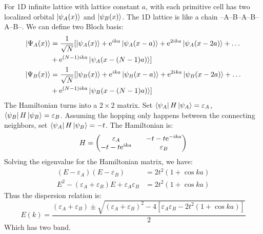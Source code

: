 \documentclass[../main.tex]{subfiles}
\begin{document}
For 1D infinite lattice with lattice constant $a$, with each primitive cell has two localized orbital $\ket{\psi_A(x)}$ and $\ket{\psi_B(x)}$. The 1D lattice is like a chain --A--B--A--B--A--B--. We can define two Bloch basis:
\begin{align}
    \ket{\Psi_A(x)} &= \frac{1}{\sqrt{N}} [\ket{\psi_A(x)} + \textrm{e}^{ika}\ket{\psi_A(x - a)} + \textrm{e}^{2ika}\ket{\psi_A(x - 2a)} + \dots\nonumber\\ &+ \textrm{e}^{(N-1)ika}\ket{\psi_A(x - (N - 1)a)}]\\
    \ket{\Psi_B(x)} &= \frac{1}{\sqrt{N}} [\ket{\psi_B(x)} + \textrm{e}^{ika}\ket{\psi_B(x - a)} + \textrm{e}^{2ika}\ket{\psi_B(x - 2a)} + \dots\nonumber\\ &+ \textrm{e}^{(N-1)ika}\ket{\psi_B(x - (N - 1)a)}]
\end{align}
The Hamiltonian turns into a $2\times2$ matrix. Set $\bra{\psi_A}H\ket{\psi_A} = \varepsilon_A$, $\bra{\psi_B}H\ket{\psi_B} = \varepsilon_B$. Assuming the hopping only happens between the connecting neighbors, set $\bra{\psi_A}H\ket{\psi_B} = -t$. The Hamiltonian is:
\begin{equation}
    H = \mqty(\varepsilon_A&& -t-t\textrm{e}^{-ika}\\ -t-t\textrm{e}^{ika}&&\varepsilon_B)
\end{equation}
Solving the eigenvalue for the Hamiltonian matrix, we have:
\begin{align}
    (E-\varepsilon_A)(E-\varepsilon_B) &= 2t^2(1 + \cos ka)\nonumber\\
    E^2 -(\varepsilon_A + \varepsilon_B)E + \varepsilon_A\varepsilon_B &= 2t^2(1 + \cos ka)
\end{align}
Thus the dispersion relation is:
\begin{equation}
    E(k) = \frac{(\varepsilon_A + \varepsilon_B) \pm \sqrt{(\varepsilon_A + \varepsilon_B)^2 - 4[\varepsilon_A\varepsilon_B - 2t^2(1 + \cos ka)]}}{2}
\end{equation}
Which has two band.
\end{document}
